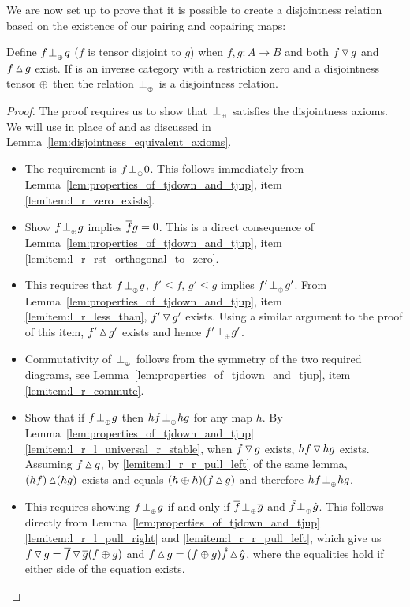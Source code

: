 We are now set up to prove that it is possible to create a disjointness relation based on the
existence of our pairing and copairing maps:
\begin{lemma}\label{lem:tensor_disjointness_is_disjointness}
  Define $f {}_{{}_{}}{\perp_{{}_{\oplus}}} g$ ($f$ is tensor disjoint to $g$) when $f, g: A\to B$ and both $f\operatorname{\triangledown} g$ and
  $f\operatorname{\vartriangle} g$ exist.  If \X is an inverse category with a restriction zero and a disjointness tensor
  $\oplus$ then the relation ${}_{{}_{}}{\perp_{{}_{\oplus}}}$ is a disjointness relation.
\end{lemma}
\begin{proof}
  The proof requires us to show that ${}_{{}_{}}{\perp_{{}_{\oplus}}}$ satisfies the disjointness axioms. We will use
   in place of  and  as discussed in
  Lemma~\ref{lem:disjointness_equivalent_axioms}.
  \begin{itemize}
    \item[\axiom{Dis}{1}] The requirement is $f {}_{{}_{}}{\perp_{{}_{\oplus}}} 0$. This follows immediately from
      Lemma~\ref{lem:properties_of_tjdown_and_tjup}, item \ref{lemitem:l_r_zero_exists}.
    \item[\axiom{Dis}{2}] Show $f {}_{{}_{}}{\perp_{{}_{\oplus}}} g$ implies $\overline{f}g = 0$. This is a direct consequence of
      Lemma~\ref{lem:properties_of_tjdown_and_tjup}, item
      \ref{lemitem:l_r_rst_orthogonal_to_zero}.
    \item[\axiom{Dis}{3}] This requires that $f{}_{{}_{}}{\perp_{{}_{\oplus}}} g$, $f' \le f$, $g' \le g$ implies $f' {}_{{}_{}}{\perp_{{}_{\oplus}}} g'$.
      From Lemma~\ref{lem:properties_of_tjdown_and_tjup}, item \ref{lemitem:l_r_less_than},
      $f'  \operatorname{\triangledown} g'$ exists. Using a similar argument to the proof of this item,
      $f' \operatorname{\vartriangle} g'$ exists and hence $f' {}_{{}_{}}{\perp_{{}_{\oplus}}} g'$.
    \item[\axiom{Dis}{4}] Commutativity of ${}_{{}_{}}{\perp_{{}_{\oplus}}}$ follows from the symmetry of the two required
      diagrams, see Lemma~\ref{lem:properties_of_tjdown_and_tjup}, item
      \ref{lemitem:l_r_commute}.
    \item[\axiom{Dis}{5}] Show that if $f{}_{{}_{}}{\perp_{{}_{\oplus}}} g$ then $h f {}_{{}_{}}{\perp_{{}_{\oplus}}} h g$ for any map $h$.
      By  Lemma~\ref{lem:properties_of_tjdown_and_tjup}\ref{lemitem:l_r_l_universal_r_stable}, when $f\operatorname{\triangledown} g$ exists, $h f \operatorname{\triangledown} h g$ exists.
      Assuming $f\operatorname{\vartriangle} g$, by \ref{lemitem:l_r_r_pull_left} of the same lemma,
      $(h f)\operatorname{\vartriangle} (h g)$ exists and equals $(h \oplus h) (f\operatorname{\vartriangle} g)$  and therefore $h f {}_{{}_{}}{\perp_{{}_{\oplus}}} h g$.
    \item[\axiom{Dis}{6'}] This requires showing $f{}_{{}_{}}{\perp_{{}_{\oplus}}} g$ if and only if $\overline{f} {}_{{}_{}}{\perp_{{}_{\oplus}}} \overline{g}$
      and $\hat{f}{}_{{}_{}}{\perp_{{}_{\oplus}}} \hat{g}$. This follows directly from
      Lemma~\ref{lem:properties_of_tjdown_and_tjup}\ref{lemitem:l_r_l_pull_right} and
      \ref{lemitem:l_r_r_pull_left}, which give us $f\operatorname{\triangledown} g = \overline{f}\operatorname{\triangledown} \overline{g} (f\oplus g)$ and
      $f\operatorname{\vartriangle} g = (f \oplus g)\hat{f}\operatorname{\vartriangle} \hat{g}$, where the equalities hold if either side of
      the equation exists.
  \end{itemize}
\end{proof}

